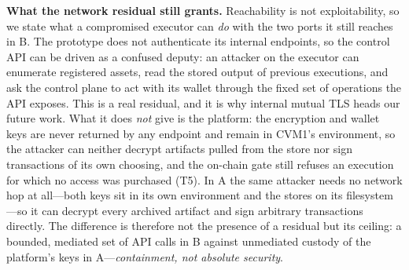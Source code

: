 \textbf{What the network residual still grants.} Reachability is not exploitability, so we
state what a compromised executor can \emph{do} with the two ports it still reaches in B.
The prototype does not authenticate its internal endpoints, so the control API can be driven
as a confused deputy: an attacker on the executor can enumerate registered assets, read the
stored output of previous executions, and ask the control plane to act with its wallet
through the fixed set of operations the API exposes. This is a real residual, and it is why
internal mutual TLS heads our future work. What it does \emph{not} give is the platform: the
encryption and wallet keys are never returned by any endpoint and remain in CVM1's
environment, so the attacker can neither decrypt artifacts pulled from the store nor sign
transactions of its own choosing, and the on-chain gate still refuses an execution for which
no access was purchased (T5). In A the same attacker needs no network hop at all---both keys
sit in its own environment and the stores on its filesystem---so it can decrypt every
archived artifact and sign arbitrary transactions directly. The difference is therefore not
the presence of a residual but its ceiling: a bounded, mediated set of API calls in B
against unmediated custody of the platform's keys in A---\emph{containment, not absolute
security}.

